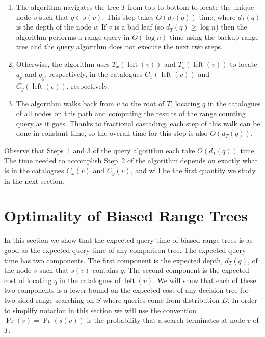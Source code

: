 \documentclass[lotsofwhite,charterfonts]{patmorin}
\DeclareMathOperator{\lft}{left}
\begin{document}
\begin{enumerate}

\item The algorithm navigates the tree $T$ from top to bottom to
locate the unique node $v$ such that $q\in s(v)$. This step takes
$O(d_T(q))$ time, where $d_T(q)$ is the depth of the node $v$.  If $v$
is a bad leaf (so $d_T(q)\ge \log n$) then the algorithm performs a
range query in $O(\log n)$ time using the backup range tree and the
query algorithm does not execute the next two steps.

\item  Otherwise, the algorithm uses $T_x(\lft(v))$ and
$T_y(\lft(v))$ to locate $q_x$ and $q_y$, respectively, in the catalogues
$C_x(\lft(v))$ and $C_y(\lft(v))$, respectively.

\item The algorithm walks back from $v$ to the root of $T$, locating
$q$ in the catalogues of all nodes on this path and computing the
results of the range counting query as it goes.  Thanks to fractional
cascading, each step of this walk can be done in constant time, so the
overall time for this step is also $O(d_T(q))$.
\end{enumerate}

Observe that Steps~1 and 3 of the query algorithm each take
$O(d_T(q))$ time.  The time needed to accomplish Step~2 of the
algorithm depends on exactly what is in the catalogues $C_x(v)$ and
$C_y(v)$, and will be the first quantity we study in the next section.

\section{Optimality of Biased Range Trees}

In this section we show that the expected query time of biased range
trees is as good as the expected query time of any comparison tree.
The expected query time has two components.  The first component is
the expected depth, $d_T(q)$,  of the node $v$ such that $s(v)$
contains $q$.  The second component is the expected cost of locating
$q$ in the catalogues of $\lft(v)$.  We will show that each of these two
components is a lower bound on the expected cost of any decision tree
for two-sided range searching on $S$ where queries come from
distribution $D$.  In order to simplify notation in this section we
will use the convention $\Pr(v)=\Pr(s(v))$ is the probability that a
search terminates at node $v$ of $T$.
\end{document}
